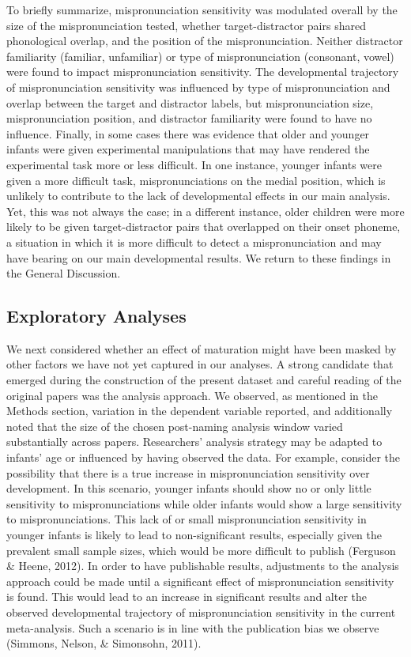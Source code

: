 \documentclass[man]{apa6}
\begin{document}
To briefly summarize, mispronunciation sensitivity was modulated overall by the size of the mispronunciation tested, whether target-distractor pairs shared phonological overlap, and the position of the mispronunciation. Neither distractor familiarity (familiar, unfamiliar) or type of mispronunciation (consonant, vowel) were found to impact mispronunciation sensitivity. The developmental trajectory of mispronunciation sensitivity was influenced by type of mispronunciation and overlap between the target and distractor labels, but mispronunciation size, mispronunciation position, and distractor familiarity were found to have no influence. Finally, in some cases there was evidence that older and younger infants were given experimental manipulations that may have rendered the experimental task more or less difficult. In one instance, younger infants were given a more difficult task, mispronunciations on the medial position, which is unlikely to contribute to the lack of developmental effects in our main analysis. Yet, this was not always the case; in a different instance, older children were more likely to be given target-distractor pairs that overlapped on their onset phoneme, a situation in which it is more difficult to detect a mispronunciation and may have bearing on our main developmental results. We return to these findings in the General Discussion.

\hypertarget{exploratory-analyses}{%
\subsection{Exploratory Analyses}\label{exploratory-analyses}}

We next considered whether an effect of maturation might have been masked by other factors we have not yet captured in our analyses. A strong candidate that emerged during the construction of the present dataset and careful reading of the original papers was the analysis approach. We observed, as mentioned in the Methods section, variation in the dependent variable reported, and additionally noted that the size of the chosen post-naming analysis window varied substantially across papers. Researchers' analysis strategy may be adapted to infants' age or influenced by having observed the data. For example, consider the possibility that there is a true increase in mispronunciation sensitivity over development. In this scenario, younger infants should show no or only little sensitivity to mispronunciations while older infants would show a large sensitivity to mispronunciations. This lack of or small mispronunciation sensitivity in younger infants is likely to lead to non-significant results, especially given the prevalent small sample sizes, which would be more difficult to publish (Ferguson \& Heene, 2012). In order to have publishable results, adjustments to the analysis approach could be made until a significant effect of mispronunciation sensitivity is found. This would lead to an increase in significant results and alter the observed developmental trajectory of mispronunciation sensitivity in the current meta-analysis. Such a scenario is in line with the publication bias we observe (Simmons, Nelson, \& Simonsohn, 2011).
\end{document}
